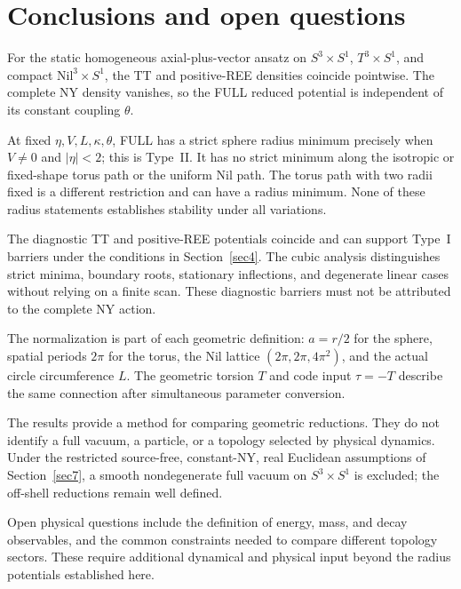 \section{Conclusions and open questions}\label{sec8}
For the static homogeneous axial-plus-vector ansatz on
$S^3\times S^1$, $T^3\times S^1$, and compact $\mathrm{Nil}^3\times S^1$,
the TT and positive-REE densities coincide pointwise.
The complete NY density vanishes, so the FULL reduced potential is
independent of its constant coupling $\theta$.

At fixed $\eta,V,L,\kappa,\theta$, FULL has a strict sphere radius
minimum precisely when $V\ne0$ and $|\eta|<2$; this is Type~II.
It has no strict minimum along the isotropic or fixed-shape torus
path or the uniform Nil path.
The torus path with two radii fixed is a different restriction and can
have a radius minimum. None of these radius statements establishes
stability under all variations.

The diagnostic TT and positive-REE potentials coincide and can support
Type~I barriers under the conditions in Section~\ref{sec4}.
The cubic analysis distinguishes strict minima, boundary roots,
stationary inflections, and degenerate linear cases without relying
on a finite scan.
These diagnostic barriers must not be attributed to the complete NY action.

The normalization is part of each geometric definition:
$a=r/2$ for the sphere, spatial periods $2\pi$ for the torus,
the Nil lattice $(2\pi,2\pi,4\pi^2)$, and the actual circle circumference $L$.
The geometric torsion $T$ and code input $\tau=-T$ describe the same
connection after simultaneous parameter conversion.

The results provide a method for comparing geometric reductions.
They do not identify a full vacuum, a particle, or a topology selected
by physical dynamics.
Under the restricted source-free, constant-NY, real Euclidean assumptions
of Section~\ref{sec7}, a smooth nondegenerate full vacuum on
$S^3\times S^1$ is excluded; the off-shell reductions remain well defined.

Open physical questions include the definition of energy, mass, and
decay observables, and the common constraints needed to compare
different topology sectors. These require additional dynamical and
physical input beyond the radius potentials established here.
